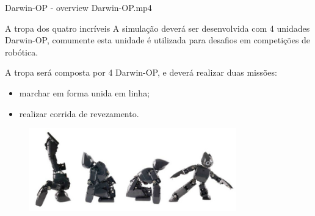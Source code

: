 \documentclass[aspectratio=169]{beamer}
\begin{document}
\begin{frame}[c]{Darwin-OP - overview}
          {Darwin-OP.mp4}



\end{frame}
\begin{frame}[c]{A tropa dos quatro incríveis}
    A simulação deverá ser desenvolvida com 4 unidades Darwin-OP, comumente esta unidade é utilizada para desafios em competições de robótica.
    \newline

    A tropa será composta por 4 Darwin-OP, e deverá realizar duas missões:
    \begin{itemize}
        \item marchar em forma unida em linha;
        \item realizar corrida de revezamento.
    \end{itemize}


    \begin{figure}
        \includegraphics[width=0.8\textwidth]{darwin-op-sequencia}
    \end{figure}
\end{frame}
\end{document}
